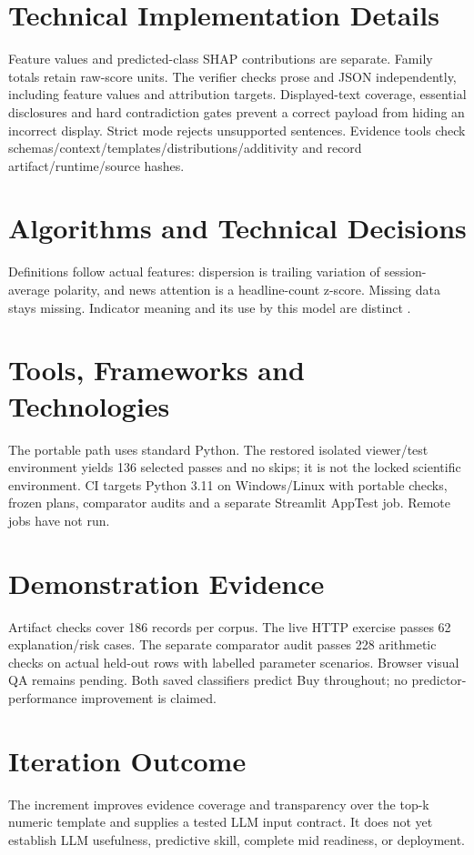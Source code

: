 \section{Technical Implementation Details}
Feature values and predicted-class SHAP contributions are separate. Family totals retain raw-score units. The verifier checks prose and JSON independently, including feature values and attribution targets. Displayed-text coverage, essential disclosures and hard contradiction gates prevent a correct payload from hiding an incorrect display. Strict mode rejects unsupported sentences. Evidence tools check schemas/context/templates/distributions/additivity and record artifact/runtime/source hashes.

\section{Algorithms and Technical Decisions}
Definitions follow actual features: dispersion is trailing variation of session-average polarity, and news attention is a headline-count z-score. Missing data stays missing. Indicator meaning and its use by this model are distinct \cite{fidelity_rsi,fidelity_macd,fidelity_obv}.

\section{Tools, Frameworks and Technologies}
The portable path uses standard Python. The restored isolated viewer/test environment yields 136 selected passes and no skips; it is not the locked scientific environment. CI targets Python 3.11 on Windows/Linux with portable checks, frozen plans, comparator audits and a separate Streamlit AppTest job. Remote jobs have not run.

\section{Demonstration Evidence}
Artifact checks cover 186 records per corpus. The live HTTP exercise passes 62 explanation/risk cases. The separate comparator audit passes 228 arithmetic checks on actual held-out rows with labelled parameter scenarios. Browser visual QA remains pending. Both saved classifiers predict Buy throughout; no predictor-performance improvement is claimed.

\section{Iteration Outcome}
The increment improves evidence coverage and transparency over the top-k numeric template and supplies a tested LLM input contract. It does not yet establish LLM usefulness, predictive skill, complete mid readiness, or deployment.
